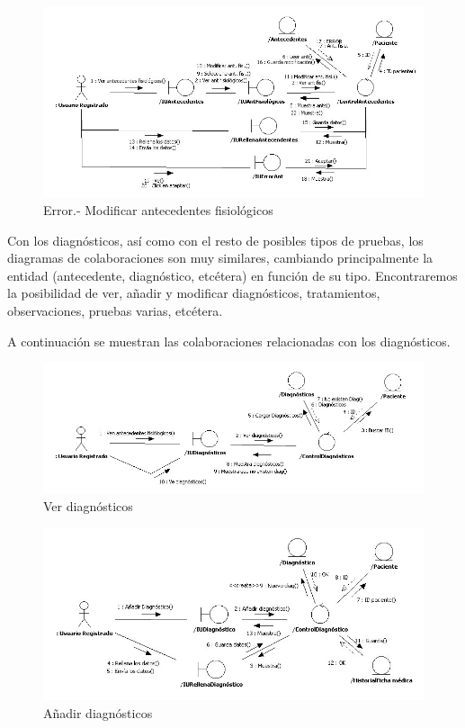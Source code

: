 \documentclass[a4paper,oneside,11pt]{book}
\begin{document}
			\begin{figure}[H]
			  \centering
			    \includegraphics[width=16cm]{img/jpg/colaboraciones/36_ModificarAntecedenteError.jpg}
			  \caption{Error.- Modificar antecedentes fisiológicos}
			  \label{fig:col_ant_fis_fm_modificar_err}
			\end{figure}
			
			
			\newpage
			Con los diagnósticos, así como con el resto de posibles tipos de pruebas, los diagramas de colaboraciones son muy similares, cambiando principalmente la entidad (antecedente, diagnóstico, etcétera) en función de su tipo. Encontraremos la posibilidad de ver, añadir y modificar diagnósticos, tratamientos, observaciones, pruebas varias, etcétera.
			
			A continuación se muestran las colaboraciones relacionadas con los diagnósticos.
			\begin{figure}[H]
			  \centering
			    \includegraphics[width=16cm]{img/jpg/colaboraciones/37_VerDiagnosticos.jpg}
			  \caption{Ver diagnósticos}
			  \label{fig:col_diag_fm}
			\end{figure}
			
			\begin{figure}[H]
			  \centering
			    \includegraphics[width=16cm]{img/jpg/colaboraciones/38_AnadirDiagnostico.jpg}
			  \caption{Añadir diagnósticos}
			  \label{fig:col_diag_fm_anadir}
			\end{figure}
			
\end{document}
